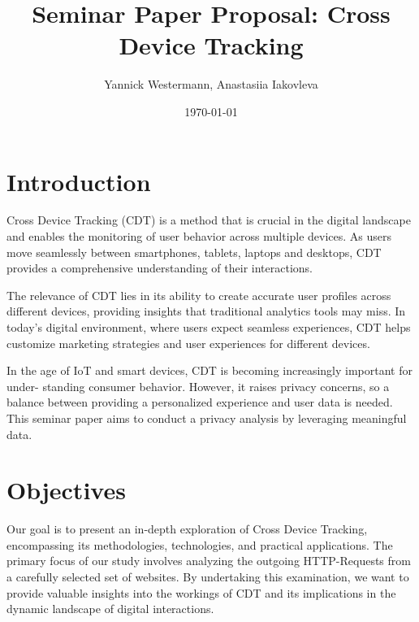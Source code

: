 \documentclass[a4paper,12pt]{article}
\title{Seminar Paper Proposal: Cross Device Tracking}
\author{Yannick Westermann, Anastasiia Iakovleva}
\date{\today}
\begin{document}
\maketitle
 
\section*{Introduction}
Cross Device Tracking (CDT) is a method that is crucial in the digital landscape and
enables the monitoring of user behavior across multiple devices. As users move seamlessly
between smartphones, tablets, laptops and desktops, CDT provides a comprehensive
understanding of their interactions.

The relevance of CDT lies in its ability to create accurate user profiles across different
devices, providing insights that traditional analytics tools may miss. In today’s digital
environment, where users expect seamless experiences, CDT helps customize marketing
strategies and user experiences for different devices.

In the age of IoT and smart devices, CDT is becoming increasingly important for under-
standing consumer behavior. However, it raises privacy concerns, so a balance between
providing a personalized experience and user data is needed. This seminar paper aims to conduct a privacy analysis by leveraging meaningful data.

\section*{Objectives}
Our goal is to present an in-depth exploration of Cross Device Tracking, encompassing its methodologies, technologies, and practical applications. 
The primary focus of our study involves analyzing the outgoing HTTP-Requests from a carefully selected set of websites. 
By undertaking this examination, we want to provide valuable insights into the workings of CDT and its implications in the dynamic landscape of digital interactions.  
\end{document}
